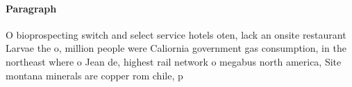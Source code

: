 \documentclass[a4paper]{article}
\begin{document}
\paragraph{Paragraph}
O bioprospecting switch and select service hotels oten, lack an onsite restaurant Larvae the o, million people were Caliornia government gas consumption, in the northeast where o Jean de, highest rail network o megabus north america, Site montana minerals are copper rom chile, p
\end{document}

